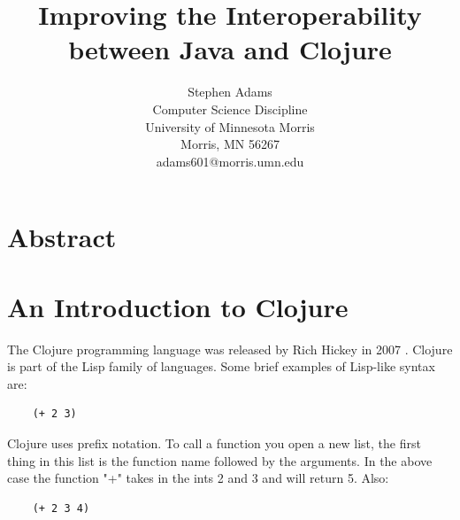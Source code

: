 \documentclass[12pt]{article}
\begin{document}
\pagestyle{plain}
%

\title{Improving the Interoperability between Java and Clojure}
%
%

\author{
Stephen Adams \\
Computer Science Discipline \\
University of Minnesota Morris\\
Morris, MN 56267\\
adams601@morris.umn.edu
}

\date{}

\maketitle
\thispagestyle{empty}

\section*{\centering Abstract}



\newpage
\setcounter{page}{1}

\section{An Introduction to Clojure}\label{sec:intro}
	The Clojure programming language was released by Rich Hickey in 2007 \cite{wiki}. Clojure is part of the Lisp family of languages. Some brief examples of Lisp-like syntax are:
	\begin{verbatim}
	(+ 2 3)
	\end{verbatim}
	Clojure uses prefix notation. To call a function you open a new list, the first thing in this list is the function name followed by the arguments. In the above case the function "+" takes in the ints 2 and 3 and will return 5. Also:
	\begin{verbatim}
	(+ 2 3 4)
	\end{verbatim} 
	
\end{document}
